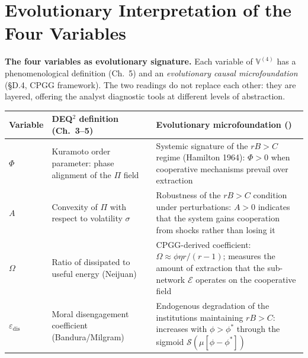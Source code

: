 \section{Evolutionary Interpretation of the Four Variables}\label{interpretazione-evolutiva-quattro-variables}

\Hypoth{} \textbf{The four variables as evolutionary signature.} Each
variable of \(\mathbb{V}^{(4)}\) has a phenomenological definition
(Ch.~5) and an \emph{evolutionary causal microfoundation} (§D.4, CPGG
framework). The two readings do not replace each other: they are
layered, offering the analyst diagnostic tools at different levels of
abstraction.

{\def\LTcaptype{none}
{\small\begin{longtable}[]{@{}
  >{\raggedright\arraybackslash}p{}
  >{\raggedright\arraybackslash}p{}
  >{\raggedright\arraybackslash}p{}@{}}
\toprule\noalign{}
\begin{minipage}[b]{\linewidth}\raggedright
Variable
\end{minipage} & \begin{minipage}[b]{\linewidth}\raggedright
DEQ$^2$ definition (Ch.~3--5)
\end{minipage} & \begin{minipage}[b]{\linewidth}\raggedright
Evolutionary microfoundation (\Hypoth{})
\end{minipage} \\
\midrule\noalign{}
\endhead
\bottomrule\noalign{}
\endlastfoot
\(\Phi\) & Kuramoto order parameter: phase alignment of the \(\Pi\)
field & Systemic signature of the \(rB > C\) regime (Hamilton 1964):
\(\Phi > 0\) when cooperative mechanisms prevail over
extraction \\ \addlinespace
\(A\) & Convexity of \(\Pi\) with respect to volatility \(\sigma\) & Robustness
of the \(rB > C\) condition under perturbations: \(A > 0\) indicates that
the system gains cooperation from shocks rather than losing it \\ \addlinespace
\(\Omega\) & Ratio of dissipated to useful energy (Neijuan) & CPGG-derived
coefficient: \(\Omega \approx \phi\eta r/(r-1)\); measures the amount of
extraction that the sub-network \(\mathcal{E}\) operates on the cooperative
field \\ \addlinespace
\(\varepsilon_{\text{dis}}\) & Moral disengagement coefficient
(Bandura/Milgram) & Endogenous degradation of the institutions maintaining
\(rB > C\): increases with \(\phi > \phi^*\) through the sigmoid
\(\mathcal{S}(\mu[\phi - \phi^*])\) \\
\end{longtable}}
}

